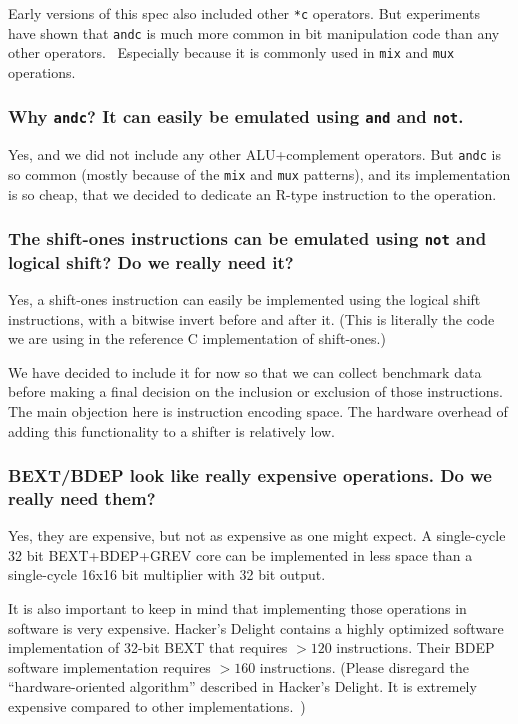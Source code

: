 Early versions of this spec also included other \texttt{*c} operators. But
experiments have shown that \texttt{andc} is much more common in bit
manipulation code than any other operators.~\cite{Wolf17A}
Especially because it is commonly used in \texttt{mix} and \texttt{mux} operations.

\subsubsection{Why \texttt{andc}? It can easily be emulated using \texttt{and} and \texttt{not}.}

Yes, and we did not include any other ALU+complement operators. But \texttt{andc}
is so common (mostly because of the \texttt{mix} and \texttt{mux} patterns), and
its implementation is so cheap, that we decided to dedicate an R-type instruction
to the operation.

\subsubsection{The shift-ones instructions can be emulated using {\tt not} and logical shift? Do we really need it?}

Yes, a shift-ones instruction can easily be implemented using the logical shift
instructions, with a bitwise invert before and after it. (This is literally the
code we are using in the reference C implementation of shift-ones.)

We have decided to include it for now so that we can collect benchmark data
before making a final decision on the inclusion or exclusion of those
instructions. The main objection here is instruction encoding space. The
hardware overhead of adding this functionality to a shifter is relatively low.

\subsubsection{BEXT/BDEP look like really expensive operations. Do we really need them?}

Yes, they are expensive, but not as expensive as one might expect. A
single-cycle 32 bit BEXT+BDEP+GREV core can be implemented in less space than a
single-cycle 16x16 bit multiplier with 32 bit output.~\cite{Wolf17B}

It is also important to keep in mind that implementing those operations in
software is very expensive. Hacker's Delight contains a highly optimized
software implementation of 32-bit BEXT that requires $>120$ instructions. Their
BDEP software implementation requires $>160$ instructions. (Please disregard the
``hardware-oriented algorithm'' described in Hacker's Delight. It is
extremely expensive compared to other implementations.~\cite{Wolf17B})


